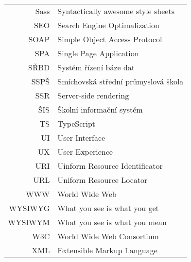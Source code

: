 \documentclass[czech,master,unicode]{ctufit-thesis}
\theoremstyle{plain}
\theoremstyle{definition}
\theoremstyle{remark}
\numberwithin{theorem}{chapter}
\begin{document}
\begin{longtable}{rl}
Sass & Syntactically awesome style sheets\\
SEO & Search Engine Optimalization\\
SOAP & Simple Object Access Protocol\\
SPA & Single Page Application\\
SŘBD & Systém řízení báze dat\\
SSPŠ & Smíchovská střední průmyslová škola\\
SSR & Server-side rendering\\
ŠIS & Školní informační systém\\
TS & TypeScript\\
UI & User Interface\\
UX & User Experience\\
URI & Uinform Resource Identificator\\
URL & Uniform Resource Locator\\
WWW & World Wide Web\\
WYSIWYG & What you see is what you get\\
WYSIWYM & What you see is what you mean\\
W3C & World Wide Web Consortium\\
XML & Extensible Markup Language\\
\end{longtable}

\mainmatter\mainmatterinit %



\appendix\appendixinit


\backmatter %

{
    \setlength{\emergencystretch}{3em} 
    \def\UrlBreaks{\do\/\do\-\do\_}
    \printbibliography
}

\end{document}
